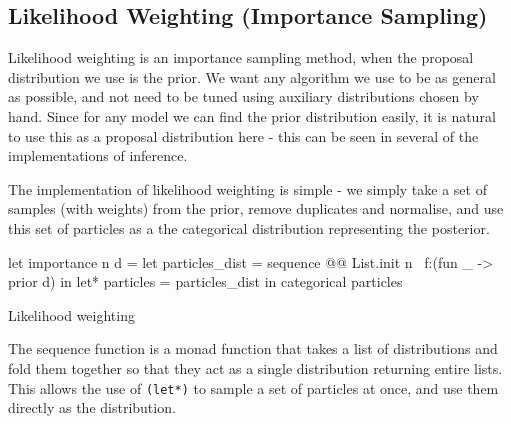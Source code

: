 \subsection{Likelihood Weighting (Importance Sampling)} \label{sec:likelihood-wighting}
					
Likelihood weighting is an importance sampling method, when the proposal distribution we use is the prior. We want any algorithm we use to be as general as possible, and not need to be tuned using auxiliary distributions chosen by hand. Since for any model we can find the prior distribution easily, it is natural to use this as a proposal distribution here - this can be seen in several of the implementations of inference. 
				
The implementation of likelihood weighting is simple - we simply take a set of samples (with weights) from the prior, remove duplicates and normalise, and use this set of particles as a the categorical distribution representing the posterior.
			\begin{listing}[!htb]
				\centering
				\begin{ocamlcode-in}
					let importance n d = 
					let particles_dist = sequence @@ List.init n ~f:(fun _ -> prior d) in
					let* particles = particles_dist in 
					categorical particles
				\end{ocamlcode-in}
				\caption{Likelihood weighting}
				\label{lst:imp}
			\end{listing}
				
The sequence function is a monad function that takes a list of distributions and fold them together so that they act as a single distribution returning entire lists. This allows the use of \texttt{(let*)} to sample a set of particles at once, and use them directly as the distribution.
				
